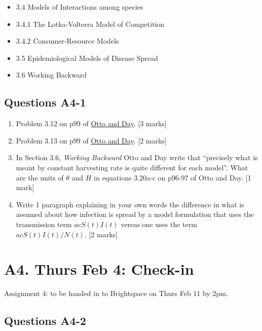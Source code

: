 \documentclass[]{book}
\providecommand{\tightlist}{%
  \setlength{\itemsep}{0pt}\setlength{\parskip}{0pt}}
\begin{document}
\begin{itemize}
\tightlist
\item
  3.4 Models of Interactions among species
\item
  3.4.1 The Lotka-Volterra Model of Competition
\item
  3.4.2 Consumer-Resource Models
\item
  3.5 Epidemiological Models of Disease Spread
\item
  3.6 Working Backward
\end{itemize}

\section{Questions A4-1}\label{questions-a4-1}

\begin{enumerate}
\def\labelenumi{\arabic{enumi}.}
\item
  Problem 3.12 on p99 of
  \href{https://ebookcentral-proquest-com.qe2a-proxy.mun.ca/lib/mun/reader.action?docID=768551\&ppg=99}{Otto
  and Day}. {[}3 marks{]}
\item
  Problem 3.13 on p99 of
  \href{https://ebookcentral-proquest-com.qe2a-proxy.mun.ca/lib/mun/reader.action?docID=768551\&ppg=99}{Otto
  and Day}. {[}2 marks{]}
\item
  In Section 3.6, \emph{Working Backward} Otto and Day write that
  ``precisely what is meant by constant harvesting rate is quite
  different for each model''. What are the units of \(\theta\) and \(H\)
  in equations 3.20a-c on p96-97 of Otto and Day. {[}1 mark{]}
\item
  Write 1 paragraph explaining in your own words the difference in what
  is assumed about how infection is spread by a model formulation that
  uses the transmission term \(acS(t)I(t)\) versus one uses the term
  \(acS(t)I(t)/N(t)\). {[}2 marks{]}
\end{enumerate}

\chapter{A4. Thurs Feb 4: Check-in}\label{a4.-thurs-feb-4-check-in}

Assignment 4: to be handed in to Brightspace on Thurs Feb 11 by 2pm.

\section{Questions A4-2}\label{questions-a4-2}
\end{document}
